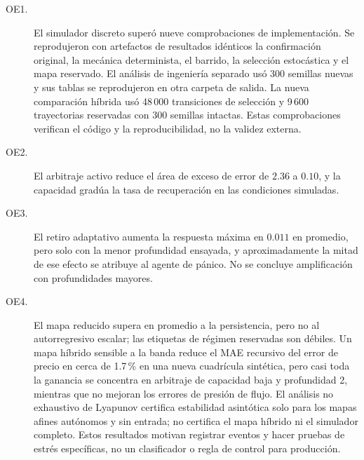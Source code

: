 \begin{description}
  \item[OE1.] El simulador discreto superó nueve comprobaciones de implementación. Se reprodujeron con artefactos de resultados idénticos la confirmación original, la mecánica determinista, el barrido, la selección estocástica y el mapa reservado. El análisis de ingeniería separado usó 300 semillas nuevas y sus tablas se reprodujeron en otra carpeta de salida. La nueva comparación híbrida usó 48\,000 transiciones de selección y 9\,600 trayectorias reservadas con 300 semillas intactas. Estas comprobaciones verifican el código y la reproducibilidad, no la validez externa.
  \item[OE2.] El arbitraje activo reduce el área de exceso de error de $2.36$ a $0.10$, y la capacidad gradúa la tasa de recuperación en las condiciones simuladas.
  \item[OE3.] El retiro adaptativo aumenta la respuesta máxima en $0.011$ en promedio, pero solo con la menor profundidad ensayada, y aproximadamente la mitad de ese efecto se atribuye al agente de pánico. No se concluye amplificación con profundidades mayores.
  \item[OE4.] El mapa reducido supera en promedio a la persistencia, pero no al autorregresivo escalar; las etiquetas de régimen reservadas son débiles. Un mapa híbrido sensible a la banda reduce el MAE recursivo del error de precio en cerca de 1.7\,\% en una nueva cuadrícula sintética, pero casi toda la ganancia se concentra en arbitraje de capacidad baja y profundidad 2, mientras que no mejoran los errores de presión de flujo. El análisis no exhaustivo de Lyapunov certifica estabilidad asintótica solo para los mapas afines autónomos y sin entrada; no certifica el mapa híbrido ni el simulador completo. Estos resultados motivan registrar eventos y hacer pruebas de estrés específicas, no un clasificador o regla de control para producción.
\end{description}

